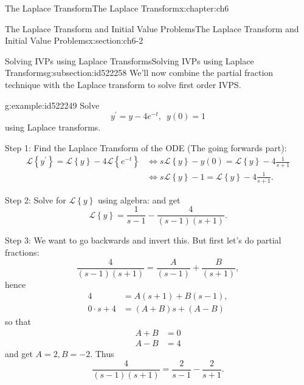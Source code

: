 \documentclass[oneside,10pt,]{book}
\numberwithin{equation}{section}
\numberwithin{equation}{section}
\newcommand{\amp}{&}
\begin{document}
\begin{chapterptx}{The Laplace Transform}{}{The Laplace Transform}{}{}{x:chapter:ch6}
\begin{sectionptx}{The Laplace Transform and Initial Value Problems}{}{The Laplace Transform and Initial Value Problems}{}{}{x:section:ch6-2}
%
%
\typeout{************************************************}
\typeout{************************************************}
%
\begin{subsectionptx}{Solving IVPs using Laplace Transforms}{}{Solving IVPs using Laplace Transforms}{}{}{g:subsection:id522258}
We'll now combine the partial fraction technique with the Laplace transform to solve first order IVPS.%
\begin{example}{}{g:example:id522249}%
Solve%
\begin{equation*}
y^{\prime}=y-4e^{-t},\,\,\,y(0)=1
\end{equation*}
using Laplace transforms.%
\par
Step 1: Find the Laplace Transform of the ODE (The going forwards part):%
\begin{align*}
\mathcal{L}\left\{ y^{\prime}\right\} =\mathcal{L}\left\{ y\right\} -4\mathcal{L}\left\{ e^{-t}\right\}  \amp \iff s\mathcal{L}\left\{ y\right\} -y(0)=\mathcal{L}\left\{ y\right\} -4\frac{1}{s+1}\\
\amp \iff s\mathcal{L}\left\{ y\right\} -1=\mathcal{L}\left\{ y\right\} -4\frac{1}{s+1}.
\end{align*}
%
\par
Step 2: Solve for \(\mathcal{L}\left\{ y\right\} \) using algebra: and get%
\begin{equation*}
\mathcal{L}\left\{ y\right\} =\frac{1}{s-1}-\frac{4}{\left(s-1\right)\left(s+1\right)}.
\end{equation*}
%
\par
Step 3: We want to go backwards and invert this. But first let's do partial fractions:%
\begin{equation*}
\frac{4}{\left(s-1\right)\left(s+1\right)}=\frac{A}{\left(s-1\right)}+\frac{B}{\left(s+1\right)},
\end{equation*}
hence%
\begin{align*}
4 \amp =A\left(s+1\right)+B\left(s-1\right),\\
0\cdot s+4 \amp =\left(A+B\right)s+\left(A-B\right)
\end{align*}
so that%
\begin{align*}
A+B \amp =0\\
A-B \amp =4
\end{align*}
and get \(A=2,B=-2\). Thus%
\begin{equation*}
\frac{4}{\left(s-1\right)\left(s+1\right)}=\frac{2}{s-1}-\frac{2}{s+1}.
\end{equation*}

\end{example}
\end{subsectionptx}
\end{sectionptx}
\end{chapterptx}
\end{document}
